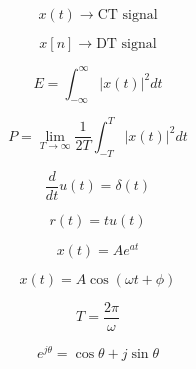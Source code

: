 \begin{tcolorbox}[title=One-Minute Revision,colback=blue!5]

\[
x(t)\rightarrow \text{CT signal}
\]

\[
x[n]\rightarrow \text{DT signal}
\]

\[
E=\int_{-\infty}^{\infty}|x(t)|^2dt
\]

\[
P=\lim_{T\to\infty}\frac{1}{2T}\int_{-T}^{T}|x(t)|^2dt
\]

\[
\frac{d}{dt}u(t)=\delta(t)
\]

\[
r(t)=tu(t)
\]

\[
x(t)=Ae^{at}
\]

\[
x(t)=A\cos(\omega t+\phi)
\]

\[
T=\frac{2\pi}{\omega}
\]

\[
e^{j\theta}=\cos\theta+j\sin\theta
\]

\end{tcolorbox}
